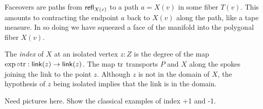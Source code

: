 Faceovers are paths from \( \mathsf{refl}_{X(v)} \) to a path \( a=X(v) \) in some fiber \( T(v) \). This amounts to contracting the endpoint \( a \) back to \( X(v) \) along the path, like a tape measure. In so doing we have squeezed a face of the manifold into the polygonal fiber \( X(v) \).

\begin{mydef}
The \emph{index} of \( X \) at an isolated vertex \( z:Z \) is the degree of the map \( \exp\circ\mathrm{tr}:\mathsf{link}(z)\to\mathsf{link}(z) \). The map \( \mathrm{tr} \) transports \( P \) and \( X \) along the spokes joining the link to the point \( z \). Although \( z \) is not in the domain of \( X \), the hypothesis of \( z \) being isolated implies that the link is in the domain.
\end{mydef}

Need pictures here. Show the classical examples of index +1 and -1.




